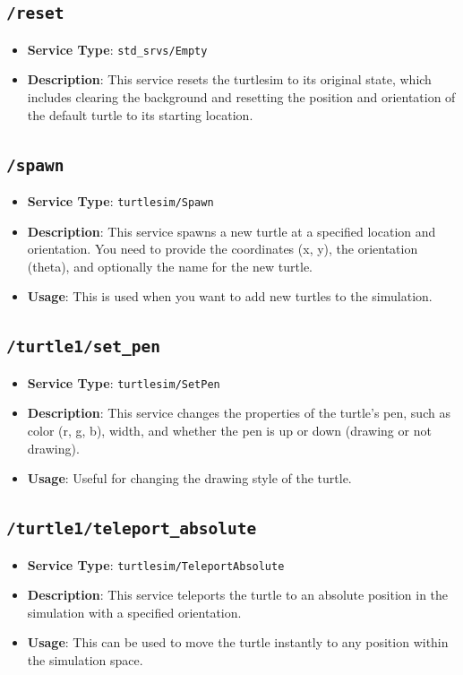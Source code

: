 \documentclass[conference]{IEEEtran}
\begin{document}
\subsection{\texttt{/reset}}
\begin{itemize}
    \item \textbf{Service Type}: \texttt{std\_srvs/Empty}
    \item \textbf{Description}: This service resets the turtlesim to its original state, which includes clearing the background and resetting the position and orientation of the default turtle to its starting location.
\end{itemize}

\subsection{\texttt{/spawn}}
\begin{itemize}
    \item \textbf{Service Type}: \texttt{turtlesim/Spawn}
    \item \textbf{Description}: This service spawns a new turtle at a specified location and orientation. You need to provide the coordinates (x, y), the orientation (theta), and optionally the name for the new turtle.
    \item \textbf{Usage}: This is used when you want to add new turtles to the simulation.
\end{itemize}

\subsection{\texttt{/turtle1/set\_pen}}
\begin{itemize}
    \item \textbf{Service Type}: \texttt{turtlesim/SetPen}
    \item \textbf{Description}: This service changes the properties of the turtle's pen, such as color (r, g, b), width, and whether the pen is up or down (drawing or not drawing).
    \item \textbf{Usage}: Useful for changing the drawing style of the turtle.
\end{itemize}

\subsection{\texttt{/turtle1/teleport\_absolute}}
\begin{itemize}
    \item \textbf{Service Type}: \texttt{turtlesim/TeleportAbsolute}
    \item \textbf{Description}: This service teleports the turtle to an absolute position in the simulation with a specified orientation.
    \item \textbf{Usage}: This can be used to move the turtle instantly to any position within the simulation space.
\end{itemize}
\end{document}
